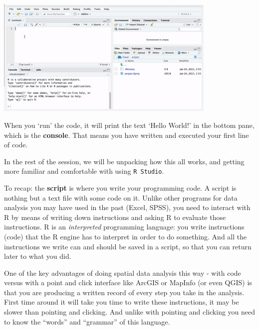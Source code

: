 \documentclass[
]{book}
\begin{document}
\includegraphics[width=400px]{img/run_hello_world}

When you `run' the code, it will print the text `Hello World!' in the bottom pane, which is the \textbf{console}. That means you have written and executed your first line of code.

In the rest of the session, we will be unpacking how this all works, and getting more familiar and comfortable with using \texttt{R\ Studio}.

To recap: the \textbf{script} is where you write your programming code. A script is nothing but a text file with some code on it. Unlike other programs for data analysis you may have used in the past (Excel, SPSS), you need to interact with R by means of writing down instructions and asking R to evaluate those instructions. R is an \emph{interpreted} programming language: you write instructions (code) that the R engine has to interpret in order to do something. And all the instructions we write can and should be saved in a script, so that you can return later to what you did.

One of the key advantages of doing spatial data analysis this way - with code versus with a point and click interface like ArcGIS or MapInfo (or even QGIS) is that you are producing a written record of every step you take in the analysis. First time around it will take you time to write these instructions, it may be slower than pointing and clicking. And unlike with pointing and clicking you need to know the ``words'' and ``grammar'' of this language.
\end{document}
